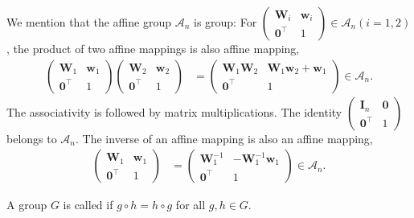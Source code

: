 We mention that the affine group $\mathcal{A}_{n}$ is group:
For $\begin{pmatrix} \bm{W}_{i} & \bm{w}_{i} \\ \bm{0}^{\top} & 1 \end{pmatrix} \in \mathcal{A}_{n} (i=1,2)$, the product of two affine mappings is also affine mapping,
\begin{align}
  \begin{pmatrix} \bm{W}_{1} & \bm{w}_{1} \\ \bm{0}^{\top} & 1 \end{pmatrix} \begin{pmatrix} \bm{W}_{2} & \bm{w}_{2} \\ \bm{0}^{\top} & 1 \end{pmatrix}
    &=
    \begin{pmatrix}
      \bm{W}_{1} \bm{W}_{2} & \bm{W}_{1} \bm{w}_{2} + \bm{w}_{1} \\
      \bm{0}^{\top} & 1
    \end{pmatrix}
    \in \mathcal{A}_{n}.
\end{align}
The associativity is followed by matrix multiplications.
The identity $ \begin{pmatrix} \bm{I}_{n} & \bm{0} \\ \bm{0}^{\top} & 1 \end{pmatrix}$ belongs to $\mathcal{A}_{n}$.
The inverse of an affine mapping is also an affine mapping,
\begin{align}
  \begin{pmatrix} \bm{W}_{1} & \bm{w}_{1} \\ \bm{0}^{\top} & 1 \end{pmatrix}
  &=
  \begin{pmatrix} \bm{W}_{1}^{-1} & -\bm{W}_{1}^{-1}\bm{w}_{1} \\ \bm{0}^{\top} & 1 \end{pmatrix} \in \mathcal{A}_{n}.
\end{align}

\begin{screen}
  \begin{defn}
    A group $G$ is called  if $g \circ h = h \circ g$ for all $g, h \in G$.
  \end{defn}
\end{screen}

